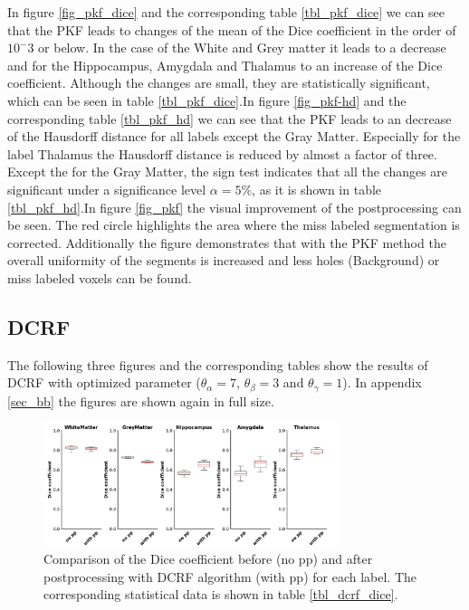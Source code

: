\documentclass[journal]{IEEEtran}
\begin{document}
In figure \ref{fig_pkf_dice} and the corresponding table \ref{tbl_pkf_dice} we can see that the PKF leads to changes of the mean of the Dice coefficient in the order of $10^-3$ or below. In the case of the White and Grey matter it leads to a decrease and for the Hippocampus, Amygdala and Thalamus to an increase of the Dice coefficient. Although the changes are small, they are statistically significant, which can be seen in table \ref{tbl_pkf_dice}.In figure \ref{fig_pkf-hd} and the corresponding table \ref{tbl_pkf_hd} we can see that the PKF leads to an decrease of the Hausdorff distance for all labels except the Gray Matter. Especially for the label Thalamus the Hausdorff distance is reduced by almost a factor of three. Except the for the Gray Matter, the sign test indicates that all the changes are significant under a significance level $\alpha = 5\%$, as it is shown in table \ref{tbl_pkf_hd}.In figure \ref{fig_pkf} the visual improvement of the postprocessing can be seen. The red circle highlights the area where the miss labeled segmentation is corrected. Additionally the figure demonstrates that with the PKF method the overall uniformity of the segments is increased and less holes (Background) or miss labeled voxels can be found.

\subsection{DCRF}
The following three figures and the corresponding tables show the results of DCRF with optimized parameter ($\theta_{\alpha} = 7$, $\theta_{\beta} = 3$ and $\theta_{\gamma} = 1$). In appendix \ref{sec_bb} the figures are shown again in full size.
\begin{figure}[ht]
\centering
\includegraphics[width=3.4in]{img/boxplots/DCRF-DICE.png}
\caption{Comparison of the Dice coefficient before (no pp) and after postprocessing with DCRF algorithm (with pp) for each label. The corresponding statistical data is shown in table \ref{tbl_dcrf_dice}.}

\label{fig_dcrf_dice}
\end{figure}
\end{document}
